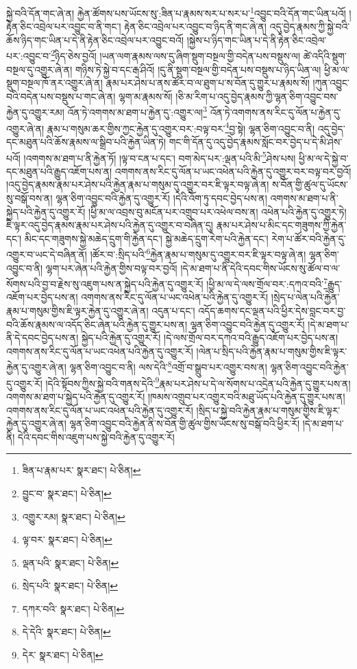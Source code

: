 སྐྱེ་བའི་དོན་གང་ཞེ་ན། རྐྱེན་ཚོགས་པས་ཡོངས་སུ་:ཟིན་པ་རྣམས་སར་པ་སར་པ་\footnote{ཟིན་པ་རྣམ་པར་  སྣར་ཐང་།  པེ་ཅིན། }འབྱུང་བའི་དོན་གང་ཡིན་པའོ། །རྟེན་ཅིང་འབྲེལ་པར་འབྱུང་བ་ནི་གང་། རྟེན་ཅིང་འབྲེལ་པར་འབྱུང་བ་ཉིད་ནི་གང་ཞེ་ན། འདུ་བྱེད་རྣམས་ཀྱི་སྐྱེ་བའི་ཆོས་ཉིད་གང་ཡིན་པ་དེ་ནི་རྟེན་ཅིང་འབྲེལ་པར་འབྱུང་བའོ། །སྐྱེས་པ་ཉིད་གང་ཡིན་པ་དེ་ནི་རྟེན་ཅིང་འབྲེལ་པར་:འབྱུང་བ་\footnote{བྱུང་བ་  སྣར་ཐང་།  པེ་ཅིན། }ཉིད་ཅེས་བྱའོ། །ཡན་ལག་རྣམས་ལས་དུ་ཞིག་སྡུག་བསྔལ་གྱི་བདེན་པས་བསྡུས་ལ། ཚེ་འདིའི་སྡུག་བསྔལ་དུ་འགྱུར་ཞེ་ན། གཉིས་ཏེ་སྐྱེ་བ་དང་རྒ་ཤིའོ། །དུ་ནི་སྡུག་བསྔལ་གྱི་བདེན་པས་བསྡུས་པ་ཉིད་ཡིན་ལ། ཕྱི་མ་ལ་སྡུག་བསྔལ་ཁོ་ནར་འགྱུར་ཞེ་ན། རྣམ་པར་ཤེས་པ་ནས་ཚོར་བ་ལ་ཐུག་པ་ས་བོན་དུ་གྱུར་པ་རྣམས་སོ། །ཀུན་འབྱུང་བའི་བདེན་པས་བསྡུས་པ་གང་ཞེ་ན། ལྷག་མ་རྣམས་སོ། །ཅི་མ་རིག་པ་འདུ་བྱེད་རྣམས་ཀྱི་ལྷན་ཅིག་འབྱུང་བས་རྐྱེན་དུ་འགྱུར་རམ། འོན་ཏེ་འགགས་མ་ཐག་པ་རྐྱེན་དུ་:འགྱུར་ལ།\footnote{འགྱུར་རམ།  སྣར་ཐང་།  པེ་ཅིན། } འོན་ཏེ་འགགས་ནས་རིང་དུ་ལོན་པ་རྐྱེན་དུ་འགྱུར་ཞེ་ན། རྣམ་པ་གསུམ་ཆར་གྱིས་ཀྱང་རྐྱེན་དུ་འགྱུར་བར་:བལྟ་བར་\footnote{ལྟ་བར་  སྣར་ཐང་།  པེ་ཅིན། }བྱ་སྟེ། ལྷན་ཅིག་འབྱུང་བ་ནི། འདུ་བྱེད་དང་མཐུན་པའི་ཆོས་རྣམས་ལ་སྒྲིབ་པའི་རྐྱེན་ཡིན་ཏེ། གང་གི་དོན་དུ་འདུ་བྱེད་རྣམས་སློང་བར་བྱེད་པ་དེ་མི་ཤེས་པའོ། །འགགས་མ་ཐག་པ་ནི་རྐྱེན་ཏོ། །ལྟ་བ་ངན་པ་དང་། བག་མེད་པར་:ལྡན་པའི་མི་\footnote{ལྡན་པའི་  སྣར་ཐང་།  པེ་ཅིན། }ཤེས་པས། ཕྱི་མ་ལ་དེ་སྐྱེ་བ་དང་མཐུན་པའི་རྒྱུད་འཇོག་པས་ན། འགགས་ནས་རིང་དུ་ལོན་པ་ཡང་འཕེན་པའི་རྐྱེན་དུ་འགྱུར་བར་བལྟ་བར་བྱའོ། །འདུ་བྱེད་རྣམས་རྣམ་པར་ཤེས་པའི་རྐྱེན་རྣམ་པ་གསུམ་དུ་འགྱུར་བར་ཇི་ལྟར་བལྟ་ཞེ་ན། ས་བོན་གྱི་ཚུལ་དུ་ཡོངས་སུ་བསྒོ་བས་ན། ལྷན་ཅིག་འབྱུང་བའི་རྐྱེན་དུ་འགྱུར་རོ། །དེའི་འོག་ཏུ་དབང་བྱེད་པས་ན། འགགས་མ་ཐག་པ་ནི་སྐྱེད་པའི་རྐྱེན་དུ་འགྱུར་རོ། །ཕྱི་མ་ལ་འབྲས་བུ་མངོན་པར་འགྲུབ་པར་འཕེལ་བས་ན། འཕེན་པའི་རྐྱེན་དུ་འགྱུར་ཏེ། ཇི་ལྟར་འདུ་བྱེད་རྣམས་རྣམ་པར་ཤེས་པའི་རྐྱེན་དུ་འགྱུར་བ་བཞིན་དུ། རྣམ་པར་ཤེས་པ་མིང་དང་གཟུགས་ཀྱི་རྐྱེན་དང་། མིང་དང་གཟུགས་སྐྱེ་མཆེད་དྲུག་གི་རྐྱེན་དང་། སྐྱེ་མཆེད་དྲུག་རེག་པའི་རྐྱེན་དང་། རེག་པ་ཚོར་བའི་རྐྱེན་དུ་འགྱུར་བ་ཡང་དེ་བཞིན་ནོ། །ཚོར་བ་:སྲིད་པའི་\footnote{སྲེད་པའི་  སྣར་ཐང་།  པེ་ཅིན། }རྐྱེན་རྣམ་པ་གསུམ་དུ་འགྱུར་བར་ཇི་ལྟར་བལྟ་ཞེ་ན། ལྷན་ཅིག་འབྱུང་བ་ནི། ལྷག་པར་ཞེན་པའི་རྐྱེན་གྱིས་བལྟ་བར་བྱའོ། །དེ་མ་ཐག་པ་ནི་དེའི་དབང་གིས་ཡོངས་སུ་ཚོལ་བ་ལ་སོགས་པའི་བྱ་བ་རྗེས་སུ་འཇུག་པས་ན་སྐྱེད་པའི་རྐྱེན་དུ་འགྱུར་རོ། །ཕྱི་མ་ལ་དེ་ལས་གྲོལ་བར་:དཀའ་བའི་\footnote{དཀར་བའི་  སྣར་ཐང་།  པེ་ཅིན། }རྒྱུད་འཇོག་པར་བྱེད་པས་ན། འགགས་ནས་རིང་དུ་ལོན་པ་ཡང་འཕེན་པའི་རྐྱེན་དུ་འགྱུར་རོ། །སྲེད་པ་ལེན་པའི་རྐྱེན་རྣམ་པ་གསུམ་གྱིས་ཇི་ལྟར་རྐྱེན་དུ་འགྱུར་ཞེ་ན། འདུན་པ་དང་། འདོད་ཆགས་དང་ལྡན་པའི་ཕྱིར་དེས་བླང་བར་བྱ་བའི་ཆོས་རྣམས་ལ་འདོད་ཅིང་ཞེན་པའི་རྐྱེན་དུ་གྱུར་པས་ན། ལྷན་ཅིག་འབྱུང་བའི་རྐྱེན་དུ་འགྱུར་རོ། །དེ་མ་ཐག་པ་ནི་དེ་དབང་བྱེད་པས་ན། སྐྱེད་པའི་རྐྱེན་དུ་འགྱུར་རོ། །དེ་ལས་གྲོལ་བར་དཀའ་བའི་རྒྱུད་འཇོག་པར་བྱེད་པས་ན། འགགས་ནས་རིང་དུ་ལོན་པ་ཡང་འཕེན་པའི་རྐྱེན་དུ་འགྱུར་རོ། །ལེན་པ་སྲིད་པའི་རྐྱེན་རྣམ་པ་གསུམ་གྱིས་ཇི་ལྟར་རྐྱེན་དུ་འགྱུར་ཞེ་ན། ལྷན་ཅིག་འབྱུང་བ་ནི། ལས་དེའི་\footnote{དེ་དེའི་  སྣར་ཐང་།  པེ་ཅིན། }འགྲོ་བ་སྒྲུབ་པར་འགྱུར་བས་ན། ལྷན་ཅིག་འབྱུང་བའི་རྐྱེན་དུ་འགྱུར་རོ། །དེའི་སྟོབས་ཀྱིས་སྐྱེ་བའི་གནས་དེའི་\footnote{དེར་  སྣར་ཐང་།  པེ་ཅིན། }རྣམ་པར་ཤེས་པ་དེ་ལ་སོགས་པ་འདྲེན་པའི་རྐྱེན་དུ་གྱུར་པས་ན། འགགས་མ་ཐག་པ་སྐྱེད་པའི་རྐྱེན་དུ་འགྱུར་རོ། །ཁམས་འགྲུབ་པར་འགྱུར་བའི་མཐུ་ཡོད་པའི་རྐྱེན་དུ་གྱུར་པས་ན། འགགས་ནས་རིང་དུ་ལོན་པ་ཡང་འཕེན་པའི་རྐྱེན་དུ་འགྱུར་རོ། །སྲིད་པ་སྐྱེ་བའི་རྐྱེན་རྣམ་པ་གསུམ་གྱིས་ཇི་ལྟར་རྐྱེན་དུ་འགྱུར་ཞེ་ན། ལྷན་ཅིག་འབྱུང་བའི་རྐྱེན་ནི་ས་བོན་གྱི་ཚུལ་གྱིས་ཡོངས་སུ་བསྒོ་བའི་ཕྱིར་རོ། །དེ་མ་ཐག་པ་ནི། དེའི་དབང་གིས་འཇུག་པས་སྐྱེ་བའི་རྐྱེན་དུ་འགྱུར་རོ། 